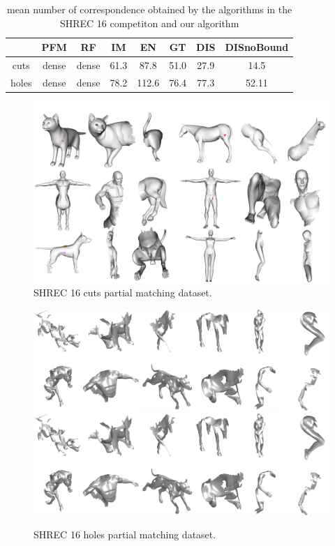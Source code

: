 \documentclass[10pt,twocolumn,letterpaper]{article}
\begin{document}
\begin{table}[h]
	\centering
	\begin{tabular}{c  c  c  c  c  c  c c} 
		\hline
		& PFM & RF & IM & EN & GT & DIS & DISnoBound \\ \hline
		cuts & dense & dense & 61.3 & 87.8 & 51.0 & 27.9 & 14.5\\ \hline
		holes & dense & dense & 78.2 & 112.6 & 76.4 & 77.3 & 52.11 \\ \hline
		
	\end{tabular}
	\caption{mean number of correspondence obtained by the algorithms in the SHREC 16 competiton and our algorithm}
	\label{table:1}
\end{table}

\begin{figure}[htb]
	\centering
	\includegraphics[width=1\textwidth]{figures/Partial_matching_shrec.png}

	\caption{SHREC 16 cuts partial matching dataset.}
\end{figure}
\begin{figure}[htb]
	\centering
	\ifpdf
	\includegraphics[width=1\textwidth]{figures/Holes.png}
	\else
	\includegraphics[width=1\textwidth]{figures/Holes.png}
	\fi
	\caption{SHREC 16 holes partial matching dataset.}
\end{figure}
\end{document}
